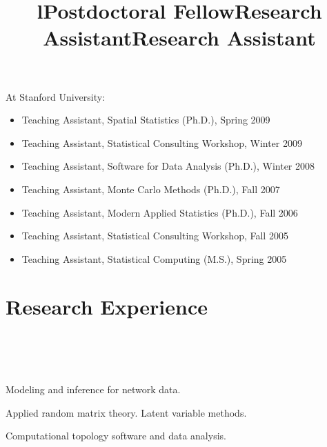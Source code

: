 \documentclass[overlapped,line,letterpaper]{res}
\begin{document}
\begin{resume}
At Stanford University:

\begin{itemize}
\item Teaching Assistant, Spatial Statistics (Ph.D.), Spring 2009
\item Teaching Assistant, Statistical Consulting Workshop, Winter 2009
\item Teaching Assistant, Software for Data Analysis (Ph.D.), Winter 2008
\item Teaching Assistant, Monte Carlo Methods (Ph.D.), Fall 2007
\item Teaching Assistant, Modern Applied Statistics (Ph.D.), Fall 2006
\item Teaching Assistant, Statistical Consulting Workshop, Fall 2005
\item Teaching Assistant, Statistical Computing (M.S.), Spring 2005
\end{itemize}


\section{\bf Research Experience}

\begin{format}
\title{l}\\
\\
\body\\
\end{format}

\title{Postdoctoral Fellow}
\begin{position}
  Modeling and inference for network data.
\end{position}

\title{Research Assistant}
\begin{position}
  Applied random matrix theory.  Latent variable methods.
\end{position}

\title{Research Assistant}
\begin{position}
  Computational topology software and data analysis.
\end{position}



\end{resume}
\end{document}

